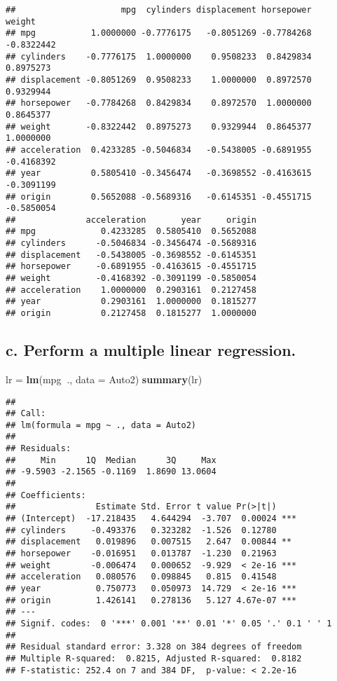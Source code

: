 \documentclass[]{article}
\newenvironment{Shaded}{\begin{snugshade}}{\end{snugshade}}
\newcommand{\DataTypeTok}[1]{\textcolor[rgb]{0.13,0.29,0.53}{#1}}
\newcommand{\KeywordTok}[1]{\textcolor[rgb]{0.13,0.29,0.53}{\textbf{#1}}}
\newcommand{\NormalTok}[1]{#1}
\newcommand{\OperatorTok}[1]{\textcolor[rgb]{0.81,0.36,0.00}{\textbf{#1}}}
\newcommand{\StringTok}[1]{\textcolor[rgb]{0.31,0.60,0.02}{#1}}
\begin{document}
\begin{verbatim}
##                     mpg  cylinders displacement horsepower     weight
## mpg           1.0000000 -0.7776175   -0.8051269 -0.7784268 -0.8322442
## cylinders    -0.7776175  1.0000000    0.9508233  0.8429834  0.8975273
## displacement -0.8051269  0.9508233    1.0000000  0.8972570  0.9329944
## horsepower   -0.7784268  0.8429834    0.8972570  1.0000000  0.8645377
## weight       -0.8322442  0.8975273    0.9329944  0.8645377  1.0000000
## acceleration  0.4233285 -0.5046834   -0.5438005 -0.6891955 -0.4168392
## year          0.5805410 -0.3456474   -0.3698552 -0.4163615 -0.3091199
## origin        0.5652088 -0.5689316   -0.6145351 -0.4551715 -0.5850054
##              acceleration       year     origin
## mpg             0.4233285  0.5805410  0.5652088
## cylinders      -0.5046834 -0.3456474 -0.5689316
## displacement   -0.5438005 -0.3698552 -0.6145351
## horsepower     -0.6891955 -0.4163615 -0.4551715
## weight         -0.4168392 -0.3091199 -0.5850054
## acceleration    1.0000000  0.2903161  0.2127458
## year            0.2903161  1.0000000  0.1815277
## origin          0.2127458  0.1815277  1.0000000
\end{verbatim}

\hypertarget{c.-perform-a-multiple-linear-regression.}{%
\subsection{c. Perform a multiple linear
regression.}\label{c.-perform-a-multiple-linear-regression.}}

\begin{Shaded}
\begin{Highlighting}[]
\NormalTok{lr =}\StringTok{ }\KeywordTok{lm}\NormalTok{(mpg}\OperatorTok{~}\NormalTok{., }\DataTypeTok{data =}\NormalTok{ Auto2)}
\KeywordTok{summary}\NormalTok{(lr)}
\end{Highlighting}
\end{Shaded}

\begin{verbatim}
## 
## Call:
## lm(formula = mpg ~ ., data = Auto2)
## 
## Residuals:
##     Min      1Q  Median      3Q     Max 
## -9.5903 -2.1565 -0.1169  1.8690 13.0604 
## 
## Coefficients:
##                Estimate Std. Error t value Pr(>|t|)    
## (Intercept)  -17.218435   4.644294  -3.707  0.00024 ***
## cylinders     -0.493376   0.323282  -1.526  0.12780    
## displacement   0.019896   0.007515   2.647  0.00844 ** 
## horsepower    -0.016951   0.013787  -1.230  0.21963    
## weight        -0.006474   0.000652  -9.929  < 2e-16 ***
## acceleration   0.080576   0.098845   0.815  0.41548    
## year           0.750773   0.050973  14.729  < 2e-16 ***
## origin         1.426141   0.278136   5.127 4.67e-07 ***
## ---
## Signif. codes:  0 '***' 0.001 '**' 0.01 '*' 0.05 '.' 0.1 ' ' 1
## 
## Residual standard error: 3.328 on 384 degrees of freedom
## Multiple R-squared:  0.8215, Adjusted R-squared:  0.8182 
## F-statistic: 252.4 on 7 and 384 DF,  p-value: < 2.2e-16
\end{verbatim}
\end{document}
